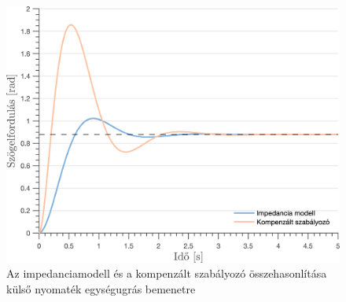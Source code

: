 \begin{figure}[ht]
    \begin{center}
    \includegraphics[width=\textwidth]{images/observer_controller_torque_resp_direct_comp.png}
    \caption{Az impedanciamodell és a kompenzált szabályozó összehasonlítása külső nyomaték egységugrás bemenetre}\label{fig:observer_controller_torque_resp_direct}
    \end{center}
\end{figure}

